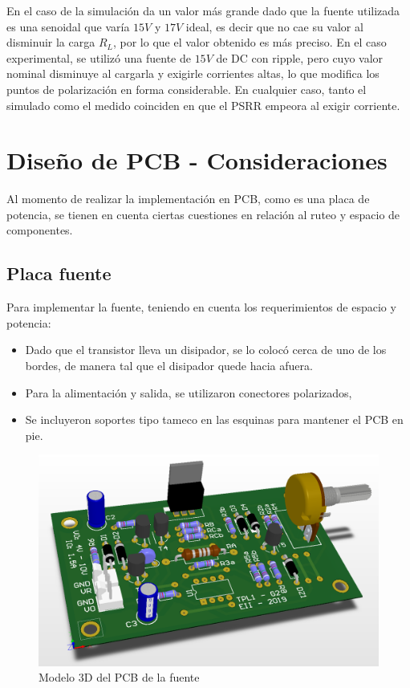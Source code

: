 En el caso de la simulaci\'on da un valor m\'as grande dado que la fuente utilizada es una senoidal que var\'ia $15V$ y $17V$ ideal, es decir que no cae su valor al disminuir la carga $R_L$, por lo que el valor obtenido es m\'as preciso.
En el caso experimental, se utiliz\'o una fuente de $15V$ de DC con ripple, pero cuyo valor nominal disminuye al cargarla y exigirle corrientes altas, lo que modifica los puntos de polarizaci\'on en forma considerable.
En cualquier caso, tanto el simulado como el medido coinciden en que el PSRR empeora al exigir corriente.


\newpage

\section{Dise\~no de PCB - Consideraciones}

Al momento de realizar la implementaci\'on en PCB, como es una placa de potencia, se tienen en cuenta ciertas cuestiones en relaci\'on al ruteo y espacio de componentes.

\subsection{Placa fuente}

Para implementar la fuente, teniendo en cuenta los requerimientos de espacio y potencia:

\begin{itemize}
\item Dado que el transistor lleva un disipador, se lo coloc\'o cerca de uno de los bordes, de manera tal que el disipador quede hacia afuera.
\item Para la alimentaci\'on y salida, se utilizaron conectores polarizados,
\item Se incluyeron soportes tipo tameco en las esquinas para mantener el PCB en pie.
\end{itemize}

\begin{figure}[!ht]
\begin{centering}
\includegraphics[scale=0.45]{Imagenes/Fuente3D.png}
\par\end{centering}
\caption{Modelo 3D del PCB de la fuente}

\end{figure}

